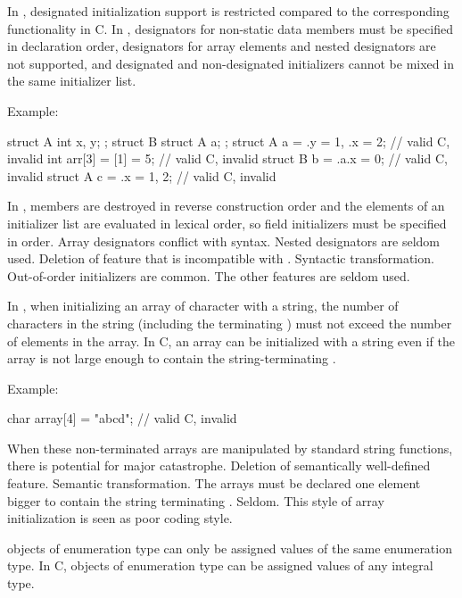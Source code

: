 \change
In \Cpp{}, designated initialization support is restricted
compared to the corresponding functionality in C\@.
In \Cpp{},
designators for non-static data members
must be specified in declaration order,
designators for array elements and nested designators
are not supported,
and
designated and non-designated initializers
cannot be mixed in the same initializer list.

Example:
\begin{codeblock}
struct A { int x, y; };
struct B { struct A a; };
struct A a = {.y = 1, .x = 2};  // valid C, invalid \Cpp{}
int arr[3] = {[1] = 5};         // valid C, invalid \Cpp{}
struct B b = {.a.x = 0};        // valid C, invalid \Cpp{}
struct A c = {.x = 1, 2};       // valid C, invalid \Cpp{}
\end{codeblock}
\rationale
In \Cpp{}, members are destroyed in reverse construction order
and the elements of an initializer list are evaluated in lexical order,
so field initializers must be specified in order.
Array designators conflict with  syntax.
Nested designators are seldom used.
\effect
Deletion of feature that is incompatible with \Cpp{}.
\difficulty
Syntactic transformation.
\howwide
Out-of-order initializers are common.
The other features are seldom used.

\change
In \Cpp{}, when initializing an array of character with a string, the number of
characters in the string (including the terminating ) must not exceed the
number of elements in the array. In C, an array can be initialized with a string even if
the array is not large enough to contain the string-terminating .

Example:
\begin{codeblock}
char array[4] = "abcd";         // valid C, invalid \Cpp{}
\end{codeblock}
\rationale
When these non-terminated arrays are manipulated by standard
string functions, there is potential for major catastrophe.
\effect
Deletion of semantically well-defined feature.
\difficulty
Semantic transformation.
The arrays must be declared one element bigger to contain the
string terminating .
\howwide
Seldom.
This style of array initialization is seen as poor coding style.

\change
\Cpp{} objects of enumeration type can only be assigned values of the same enumeration type.
In C, objects of enumeration type can be assigned values of any integral type.

